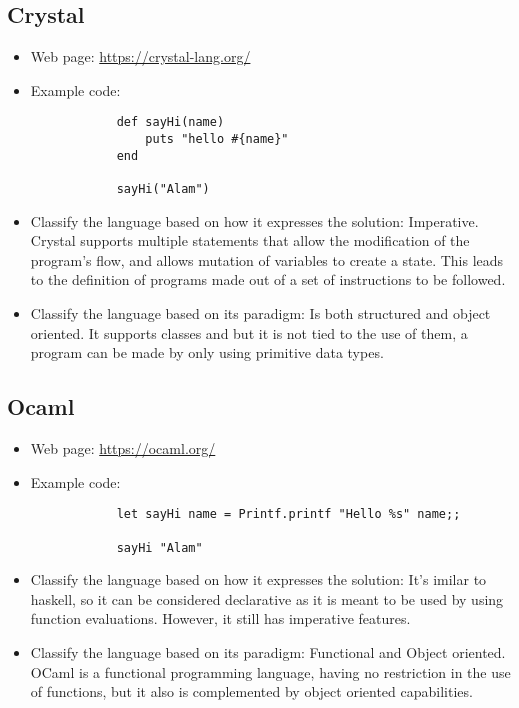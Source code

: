 \documentclass[]{article}
\begin{document}
    \subsection{Crystal}

    \begin{itemize}
    
        \item Web page: \url{https://crystal-lang.org/}
        \item Example code:
        \begin{lstlisting}
            def sayHi(name) 
                puts "hello #{name}"
            end

            sayHi("Alam")
        \end{lstlisting}

        \item Classify the language based on how it expresses the solution: 
            Imperative. Crystal supports multiple statements that allow the modification of the program's flow, and allows mutation 
            of variables to create a state. This leads to the definition of programs made out of a set of instructions to be followed. 
        \item  Classify the language based on its paradigm:
            Is both structured and object oriented. It supports classes and but it is not tied to the use of them, a program can be made
            by only using primitive data types.
        
    \end{itemize}

    \subsection{Ocaml}

    \begin{itemize}
    
        \item Web page: \url{https://ocaml.org/}
        \item Example code:
        \begin{lstlisting}
            let sayHi name = Printf.printf "Hello %s" name;;
    
            sayHi "Alam"
        \end{lstlisting}

        \item Classify the language based on how it expresses the solution: 
            It's imilar to haskell, so it can be considered declarative as it is meant to be used by using function evaluations. 
            However, it still has imperative features.
        \item  Classify the language based on its paradigm:
            Functional and Object oriented. OCaml is a functional programming language, having no restriction in the use of functions, but it also is complemented
            by object oriented capabilities.
        
        
    \end{itemize}
\end{document}
